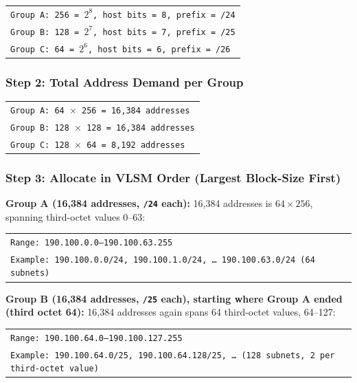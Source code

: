 \documentclass[11pt,a4paper]{article}
\begin{document}
\begin{tabularx}{\textwidth}{@{}X@{}}
\texttt{Group A: 256 = $2^{8}$, host bits = 8, prefix = /24} \\
\texttt{Group B: 128 = $2^{7}$, host bits = 7, prefix = /25} \\
\texttt{Group C: 64 = $2^{6}$, host bits = 6, prefix = /26} \\
\end{tabularx}

\subsubsection*{Step 2: Total Address Demand per Group}

\begin{tabularx}{\textwidth}{@{}X@{}}
\texttt{Group A: 64 $\times$ 256 = 16,384 addresses} \\
\texttt{Group B: 128 $\times$ 128 = 16,384 addresses} \\
\texttt{Group C: 128 $\times$ 64 = 8,192 addresses} \\
\end{tabularx}

\subsubsection*{Step 3: Allocate in VLSM Order (Largest Block-Size First)}

\textbf{Group A (16,384 addresses, \texttt{/24} each):} 16,384 addresses is
$64 \times 256$, spanning third-octet values 0--63:

\begin{tabularx}{\textwidth}{@{}X@{}}
\texttt{Range: 190.100.0.0--190.100.63.255} \\
\texttt{Example: 190.100.0.0/24, 190.100.1.0/24, \ldots{} 190.100.63.0/24 (64 subnets)} \\
\end{tabularx}

\textbf{Group B (16,384 addresses, \texttt{/25} each), starting where Group A
ended (third octet 64):} 16,384 addresses again spans 64 third-octet values,
64--127:

\begin{tabularx}{\textwidth}{@{}X@{}}
\texttt{Range: 190.100.64.0--190.100.127.255} \\
\texttt{Example: 190.100.64.0/25, 190.100.64.128/25, \ldots{} (128 subnets, 2 per third-octet value)} \\
\end{tabularx}
\end{document}
